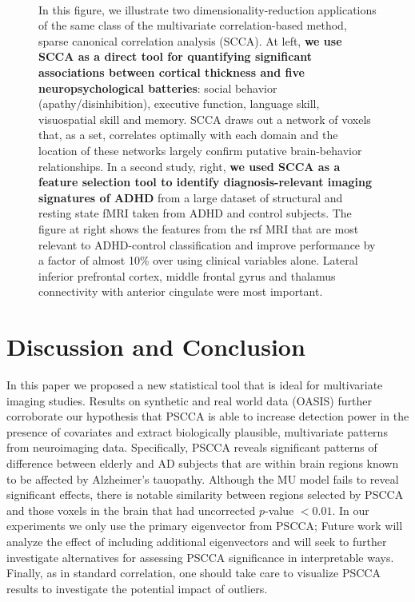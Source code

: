 \documentclass{llncs}
\newcommand{\X}{{\bf X}}
\newcommand{\Y}{{\bf Y}}
\begin{document}
\begin{figure}
\centering
\mbox{
\quad
{}
}
\caption{In this figure, we illustrate two dimensionality-reduction applications of the same
  class of the multivariate correlation-based method, sparse canonical
  correlation analysis (SCCA).  At left, {\bf we use SCCA as a direct tool for quantifying significant
  associations between cortical thickness and five neuropsychological
  batteries}: social behavior (apathy/disinhibition), executive
  function, language skill, visuospatial skill and memory.  SCCA draws out a network of
  voxels that, as a set, correlates optimally with each domain and
  the location of these networks  largely confirm putative brain-behavior
  relationships.  In a second study, right, {\bf we used SCCA as a feature
  selection tool to identify diagnosis-relevant imaging signatures of ADHD} from a large dataset of
  structural and resting state fMRI taken from ADHD and control
  subjects. The figure at right shows the features from the rsf MRI that are most relevant to ADHD-control classification and
improve performance by a factor of almost 10\% over using clinical variables
alone.  Lateral inferior prefrontal cortex, middle frontal gyrus and thalamus
connectivity with anterior cingulate were most important.} \label{fig:fig3}
\end{figure}

\section{Discussion and Conclusion}
In this paper we proposed a new statistical tool that is
ideal for multivariate imaging studies. 
Results on synthetic and
real world data (OASIS) further corroborate our hypothesis that PSCCA
is able to increase detection power in the presence of covariates and
extract biologically plausible, multivariate patterns from neuroimaging
data.  Specifically, PSCCA reveals significant patterns of difference
between elderly and AD subjects that are within brain regions known to
be affected by Alzheimer's tauopathy.  Although the MU model fails to reveal
significant effects, there is notable similarity between regions selected by PSCCA and
those voxels in the brain that had uncorrected $p$-value $< 0.01$.  %
In our experiments we only use the
primary eigenvector from PSCCA;
Future work will analyze the effect of including additional
eigenvectors and will seek to further investigate alternatives for
assessing PSCCA significance in interpretable ways. Finally, as in standard correlation, one should take care to visualize PSCCA results to investigate the potential impact of outliers. 
\end{document}
